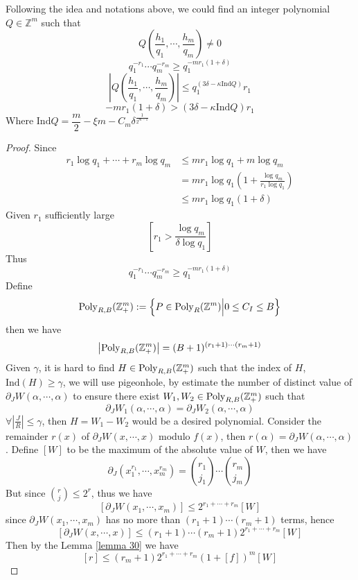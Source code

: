 \begin{theorem}\label{theorem 29}
Following the idea and notations above, we could find an integer polynomial $ Q \in \mathbb{Z}^{m} $ such that
$$ Q\left(\frac{h_{1}}{q_{1}},\cdots,\frac{h_{m}}{q_{m}}\right) \neq 0 $$
$$ q_{1}^{-r_{1}} \cdots q_{m}^{-r_{m}} \geq q_{1}^{-mr_{1}(1+\delta)} $$
$$ \left| Q\left(\dfrac{h_{1}}{q_{1}},\cdots,\dfrac{h_{m}}{q_{m}}\right) \right| \leq q_{1}^{(3\delta-\kappa \mathrm{Ind}Q)}r_{1} $$
$$ -mr_{1}(1+\delta) > (3\delta-\kappa \mathrm{Ind}Q)r_{1} $$
Where $ \mathrm{Ind}Q = \dfrac{m}{2}-\xi m-C_{m}\delta^{\frac{1}{2^{m-1}}} $
\end{theorem}

\begin{proof}
Since 
$$ 
\begin{aligned}
r_{1}\log q_{1}+\cdots+r_{m}\log q_{m} 
&\leq mr_{1}\log q_{1}+m\log q_{m} \\
&= mr_{1}\log q_{1}\left( 1+\frac{\log q_{m}}{r_{1}\log q_{1}} \right) \\
&\leq mr_{1}\log q_{1}(1+\delta)
\end{aligned}
$$
Given $ r_{1} $ sufficiently large 
$$ \left[ r_{1} > \dfrac{\log q_{m}}{\delta\log q_{1}} \right] $$
Thus
$$ q_{1}^{-r_{1}} \cdots q_{m}^{-r_{m}} \geq q_{1}^{-mr_{1}(1+\delta)} $$
Define
$$ \operatorname{Poly}_{R,B}(\mathbb{Z}_{+}^{m}) := \left\{ P \in \operatorname{Poly}_{R}(\mathbb{Z}^{m}) \Big| 0 \leq C_{I} \leq B \right\} $$
then we have
$$ \left| \operatorname{Poly}_{R,B}(\mathbb{Z}_{+}^{m}) \right| = (B+1)^{(r_{1}+1) \cdots (r_{m}+1)} $$
Given $ \gamma $, it is hard to find $ H \in \operatorname{Poly}_{R,B}(\mathbb{Z}_{+}^{m}) $ such that the index of $ H $, $ \mathrm{Ind}(H) \geq \gamma $, we will use pigeonhole, by estimate the number of distinct value of $ \partial_{J}W(\alpha,\cdots,\alpha) $ to ensure there exist $ W_{1}, W_{2} \in \operatorname{Poly}_{R,B}(\mathbb{Z}_{+}^{m}) $ such that
$$ \partial_{J}W_{1}(\alpha,\cdots,\alpha) = \partial_{J}W_{2}(\alpha,\cdots,\alpha) $$
$ \forall \left| \frac{J}{R} \right| \leq \gamma $, then $ H = W_{1} - W_{2} $ would be a desired polynomial. Consider the remainder $ r(x) $ of $ \partial_{J}W(x,\cdots,x) $ 
modulo $ f(x) $, then $ r(\alpha) = \partial_{J}W(\alpha,\cdots,\alpha) $. Define $ [W] $ to be the maximum of the absolute value of $ W $, then we have
$$ \partial_{J}(x_{1}^{r_{1}},\cdots,x_{m}^{r_{m}}) = \binom{r_{1}}{j_{1}} \cdots \binom{r_{m}}{j_{m}} $$
But since $ \binom{r}{j} \leq 2^{r} $, thus we have
$$ [\partial_{J}W(x_{1},\cdots,x_{m})] \leq 2^{r_{1}+\cdots+r_{m}}[W] $$
since $ \partial_{J}W(x_{1},\cdots,x_{m}) $ has no more than $ (r_{1}+1) \cdots (r_{m}+1) $ terms, hence 
$$ [\partial_{J}W(x,\cdots,x)] \leq (r_{1}+1) \cdots (r_{m}+1)2^{r_{1}+\cdots+r_{m}}[W] $$
Then by the Lemma \ref{lemma 30} we have
$$ [r] \leq (r_{m}+1)2^{r_{1}+\cdots+r_{m}}(1+[f])^{m}[W] $$
\end{proof}

